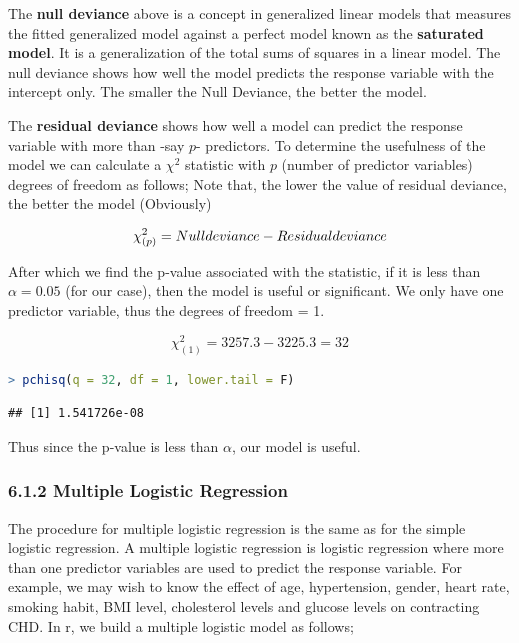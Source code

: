 \documentclass[
]{article}
\begin{document}
The \textbf{null deviance} above is a concept in generalized linear
models that measures the fitted generalized model against a perfect
model known as the \textbf{saturated model}. It is a generalization of
the total sums of squares in a linear model. The null deviance shows how
well the model predicts the response variable with the intercept only.
The smaller the Null Deviance, the better the model.

The \textbf{residual deviance} shows how well a model can predict the
response variable with more than -say \(p\)- predictors. To determine
the usefulness of the model we can calculate a \(\chi^2\) statistic with
\(p\) (number of predictor variables) degrees of freedom as follows;
Note that, the lower the value of residual deviance, the better the
model (Obviously)

\[\chi^2_{(p)}=Null\space deviance\space -\space Residual\space deviance\]

After which we find the p-value associated with the statistic, if it is
less than \(\alpha=0.05\) (for our case), then the model is useful or
significant. We only have one predictor variable, thus the degrees of
freedom = 1.

\[\chi^2_{(1)}= 3257.3-3225.3=32\]

\begin{lstlisting}[language=R]
> pchisq(q = 32, df = 1, lower.tail = F)
\end{lstlisting}

\begin{lstlisting}
## [1] 1.541726e-08
\end{lstlisting}

Thus since the p-value is less than \(\alpha\), our model is useful.

\hypertarget{multiple-logistic-regression}{%
\subsubsection{6.1.2 Multiple Logistic
Regression}\label{multiple-logistic-regression}}

The procedure for multiple logistic regression is the same as for the
simple logistic regression. A multiple logistic regression is logistic
regression where more than one predictor variables are used to predict
the response variable. For example, we may wish to know the effect of
age, hypertension, gender, heart rate, smoking habit, BMI level,
cholesterol levels and glucose levels on contracting CHD. In r, we build
a multiple logistic model as follows;
\end{document}
